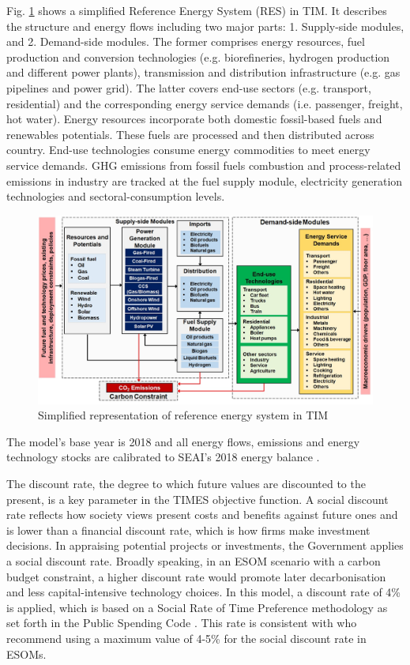 \documentclass[gmd,manuscript]{copernicus}
\begin{document}
Fig. \ref{fig:TIM-RES} shows a simplified Reference Energy System (RES) in TIM. It describes the structure and energy flows including two major parts: 1. Supply-side modules, and 2. Demand-side modules. The former comprises energy resources, fuel production and conversion technologies (e.g. biorefineries, hydrogen production and different power plants), transmission and distribution infrastructure (e.g. gas pipelines and power grid). The latter covers end-use sectors (e.g. transport, residential) and the corresponding energy service demands (i.e. passenger, freight, hot water). Energy resources incorporate both domestic fossil-based fuels and renewables potentials. These fuels are processed and then distributed across country. End-use technologies consume energy commodities to meet energy service demands. GHG emissions from fossil fuels combustion and process-related emissions in industry are tracked at the fuel supply module, electricity generation technologies and sectoral-consumption levels. 

\begin{figure}[ht]
 \centering
 \includegraphics[scale=0.6]{figures/TIM_RES.jpg} 
 \caption{Simplified representation of reference energy system in TIM}
 \label{fig:TIM-RES}
\end{figure}

The model's base year is 2018 and all energy flows, emissions and energy technology stocks are calibrated to SEAI's 2018 energy balance \citep{SEAI2019}.

The discount rate, the degree to which future values are discounted to the present, is a key parameter in the TIMES objective function. A social discount rate reflects how society views present costs and benefits against future ones and is lower than a financial discount rate, which is how firms make investment decisions. In appraising potential projects or investments, the Government applies a social discount rate. Broadly speaking, in an ESOM scenario with a carbon budget constraint, a higher discount rate would promote later decarbonisation and less capital-intensive technology choices. In this model, a discount rate of 4\% is applied, which is based on a Social Rate of Time Preference methodology as set forth in the Public Spending Code \citep{OCallaghan2018}. This rate is consistent with \citet{Garcia-Gusano2016} who recommend using a maximum value of 4-5\% for the social discount rate in ESOMs. 
\end{document}
